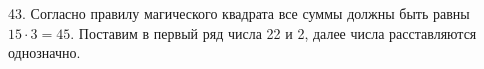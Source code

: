 43. Согласно правилу магического квадрата все суммы должны быть равны $15\cdot3=45.$ Поставим в первый ряд числа 22 и 2, далее числа расставляются однозначно.
\begin{center}
\begin{figure}[ht!]
\end{figure}
\end{center}
